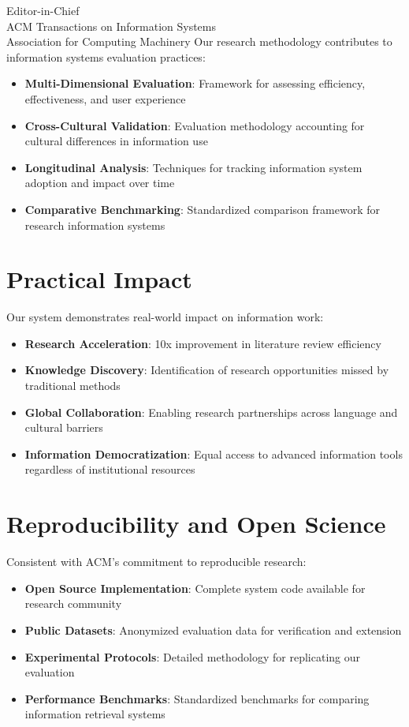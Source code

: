 \documentclass[11pt]{letter}
\begin{document}
\begin{letter}{Editor-in-Chief\\
ACM Transactions on Information Systems\\
Association for Computing Machinery}
Our research methodology contributes to information systems evaluation practices:

\begin{itemize}
    \item \textbf{Multi-Dimensional Evaluation}: Framework for assessing efficiency, effectiveness, and user experience
    \item \textbf{Cross-Cultural Validation}: Evaluation methodology accounting for cultural differences in information use
    \item \textbf{Longitudinal Analysis}: Techniques for tracking information system adoption and impact over time
    \item \textbf{Comparative Benchmarking}: Standardized comparison framework for research information systems
\end{itemize}

\section*{Practical Impact}

Our system demonstrates real-world impact on information work:

\begin{itemize}
    \item \textbf{Research Acceleration}: 10x improvement in literature review efficiency
    \item \textbf{Knowledge Discovery}: Identification of research opportunities missed by traditional methods
    \item \textbf{Global Collaboration}: Enabling research partnerships across language and cultural barriers
    \item \textbf{Information Democratization}: Equal access to advanced information tools regardless of institutional resources
\end{itemize}

\section*{Reproducibility and Open Science}

Consistent with ACM's commitment to reproducible research:

\begin{itemize}
    \item \textbf{Open Source Implementation}: Complete system code available for research community
    \item \textbf{Public Datasets}: Anonymized evaluation data for verification and extension
    \item \textbf{Experimental Protocols}: Detailed methodology for replicating our evaluation
    \item \textbf{Performance Benchmarks}: Standardized benchmarks for comparing information retrieval systems
\end{itemize}


\end{letter}
\end{document}
